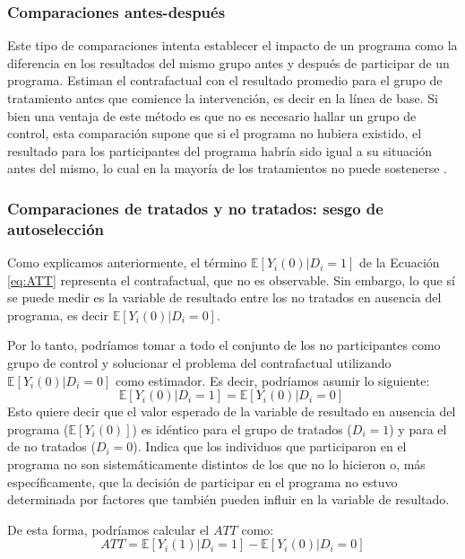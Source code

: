 \documentclass[../../main.tex]{subfiles}
\begin{document}
\subsubsection{Comparaciones antes-después}
Este tipo de comparaciones intenta establecer el impacto de un programa como la diferencia
en los resultados del mismo grupo antes y después de participar de un programa. Estiman el
contrafactual con el resultado promedio para el grupo de tratamiento antes que comience la
intervención, es decir en la línea de base. Si bien una ventaja de este método es que no
es necesario hallar un grupo de control, esta comparación supone que si el programa no
hubiera existido, el resultado para los participantes del programa habría sido igual a su
situación antes del mismo, lo cual en la mayoría de los tratamientos no puede sostenerse
\cite{gertler-2016}.

\subsubsection{Comparaciones de tratados y no tratados: sesgo de autoselección}
Como explicamos anteriormente, el término \(\mathbb{E} \left[Y_i(0)|D_i=1\right]\) de la
Ecuación \ref{eq:ATT} representa el contrafactual, que no es observable. Sin embargo, lo
que sí se puede medir es la variable de resultado entre los no tratados en ausencia del
programa, es decir \(\mathbb{E} \left[Y_i(0)|D_i=0\right]\).

Por lo tanto, podríamos tomar a todo el conjunto de los no participantes como grupo de
control y solucionar el problema del contrafactual utilizando \(\mathbb{E}
\left[Y_i(0)|D_i=0\right]\) como estimador. Es decir, podríamos asumir lo siguiente:
\begin{equation}
    \mathbb{E} \left[Y_i(0)|D_i=1\right] = \mathbb{E} \left[Y_i(0)|D_i=0\right]\
    \label{eq:supuesto-1}  %
\end{equation}
Esto quiere decir que el valor esperado de la variable de resultado en ausencia del
programa (\(\mathbb{E}\left[Y_i(0)\right]\)) es idéntico para el grupo de tratados (\(D_i
= 1\)) y para el de no tratados (\(D_i = 0\)). Indica que los individuos que participaron
en el programa no son sistemáticamente distintos de los que no lo hicieron \cite{bernal}
o, más específicamente, que la decisión de participar en el programa no estuvo determinada
por factores que también pueden influir en la variable de resultado.

De esta forma, podríamos calcular el \(ATT\) como:
\begin{equation}
    ATT = \mathbb{E} \left[Y_i(1)|D_i=1\right] - \mathbb{E} \left[Y_i(0)|D_i=0\right]
    \label{eq:ATT-con-supuesto-IC}
\end{equation}
\end{document}
